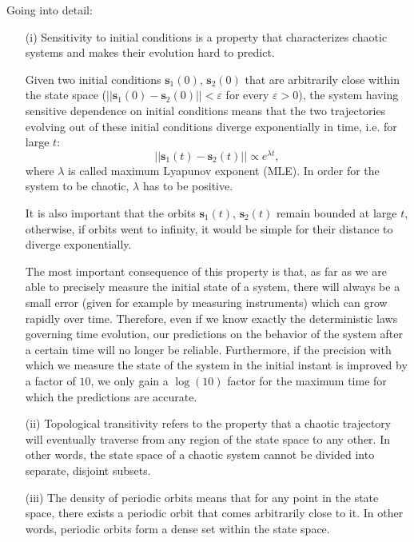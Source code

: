 Going into detail:
\begin{itemize}
    \item[(i)] Sensitivity to initial conditions is a property that characterizes chaotic
    systems and makes their evolution hard to predict.

    Given two initial conditions $\mathbf{s}_1(0)$, $\mathbf{s}_2(0)$ that are arbitrarily close within the state
    space ($||\mathbf{s}_1(0)-\mathbf{s}_2(0)||<\varepsilon$ for every $\varepsilon > 0$),
    the system having sensitive dependence on initial conditions means that
    the two trajectories evolving out of these initial conditions diverge exponentially in time, i.e.
    for large $t$:
    \begin{equation}
    \label{eq: trajectory divergence}
        ||\mathbf{s}_1(t)-\mathbf{s}_2(t)||\propto e^{\lambda t},
    \end{equation}
    where $\lambda$ is called maximum Lyapunov exponent (MLE).
    In order for the system to be chaotic, $\lambda$ has to be positive.

    It is also important that the orbits $\mathbf{s}_1(t)$, $\mathbf{s}_2(t)$ remain bounded at large $t$,
    otherwise, if orbits went to infinity, it would be simple for their distance to diverge exponentially.
    
    The most important consequence of this property is that, as far as we are
    able to precisely measure the initial state of a system, there will always be
    a small error (given for example by measuring instruments) which can grow
    rapidly over time. Therefore, even if we know exactly the deterministic laws
    governing time evolution, our predictions on the behavior of the system
    after a certain time will no longer be reliable. Furthermore, if the precision
    with which we measure the state of the system in the initial instant is
    improved by a factor of $10$, we only gain a $\log(10)$ factor for the maximum
    time for which the predictions are accurate.

    \item[(ii)] %
    Topological transitivity refers to the property that a chaotic trajectory will eventually traverse from any region of the state space to any other. In other words, the state space of a chaotic system cannot be divided into separate, disjoint subsets.

    \item[(iii)] %
    The density of periodic orbits means that for any point in the state space, there exists a periodic orbit that comes arbitrarily close to it. In other words, periodic orbits form a dense set within the state space.

\end{itemize}


